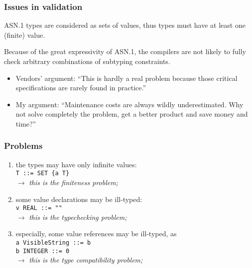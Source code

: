 \documentclass[compress,dvips,xcolor={dvipsnames},t]{beamer}
\newcommand\ASN{\textsf{ASN.1}\xspace}
\newcounter{savedenum}
\newcommand*{\saveenum}{\setcounter{savedenum}{\theenumi}}
\begin{document}
\begin{frame}
\frametitle{Issues in validation}

\ASN types are considered as sets of values, thus types must have at
least one (finite) value.

\bigskip

Because of the great expressivity of \ASN, the compilers are not
likely to fully check arbitrary combinations of subtyping
constraints.

\bigskip

\begin{itemize}

\item Vendors' argument: ``This is hardly a real problem because those
  critical specifications are rarely found in practice.''

\bigskip

\item My argument: ``Maintenance costs are always wildly
  underestimated. Why not solve completely the problem, get a better
  product and save money and time?''

\end{itemize}

\end{frame}


\begin{frame}
\frametitle{Problems}

\begin{enumerate}
  
  \item \label{finiteness} the types may have only infinite
        values:\\
        \texttt{T ::= SET \{a T\}}\\
        \(\rightarrow\) \emph{this is the finiteness problem;}

  \item \label{type_conformance} some value declarations may be
        ill-typed:\\
        \texttt{v REAL ::= ""}\\
        \(\rightarrow\) \emph{this is the typechecking problem;}

  \item \label{type_compatibility} especially, some value references
        may be ill-typed, as\\
        \texttt{a VisibleString ::= b}\\
        \texttt{b INTEGER ::= 0}\\
        \(\rightarrow\) \emph{this is the type compatibility problem;}

\saveenum

\end{enumerate}

\end{frame}
\end{document}
